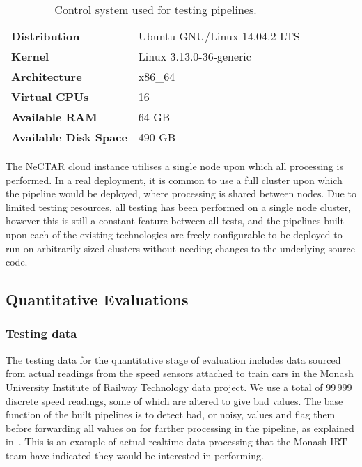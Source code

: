 \begin{table}[h]
\caption{Control system used for testing pipelines.}
\label{tab:control}
\centering
\begin{tabular}{ll}
\textbf{Distribution}         & Ubuntu GNU/Linux 14.04.2 LTS \\
\textbf{Kernel}               & Linux 3.13.0-36-generic    \\
\textbf{Architecture}         & x86\_64                    \\
\textbf{Virtual CPUs}         & 16                         \\
\textbf{Available RAM}        & 64 GB                      \\
\textbf{Available Disk Space} & 490 GB
\end{tabular}
\end{table}

The NeCTAR cloud instance utilises a single node upon which all processing is performed. In a real deployment, it is
common to use a full cluster upon which the pipeline would be deployed, where processing is shared between nodes. Due to
limited testing resources, all testing
has been performed on a single node cluster, however this is still a constant feature between all tests, and the pipelines built upon
each of the existing technologies are freely configurable to be deployed to run on arbitrarily sized clusters without
needing changes to the underlying source code.



\subsection{Quantitative Evaluations} %
\label{sub:quantitative_evaluations}

\subsubsection{Testing data} %
\label{ssub:testing_data}

The testing data for the quantitative stage of evaluation includes data sourced from actual readings from the speed
sensors attached to train cars in the Monash University Institute of Railway Technology data project. We use a total
of 99\,999 discrete speed readings, some of which are altered to give bad values. The base function of
the built pipelines is to detect bad, or noisy, values and flag them before forwarding all values on for further processing
in the pipeline, as explained in~. This is an example of actual realtime data processing that
the Monash IRT team have indicated they would be interested in performing.

